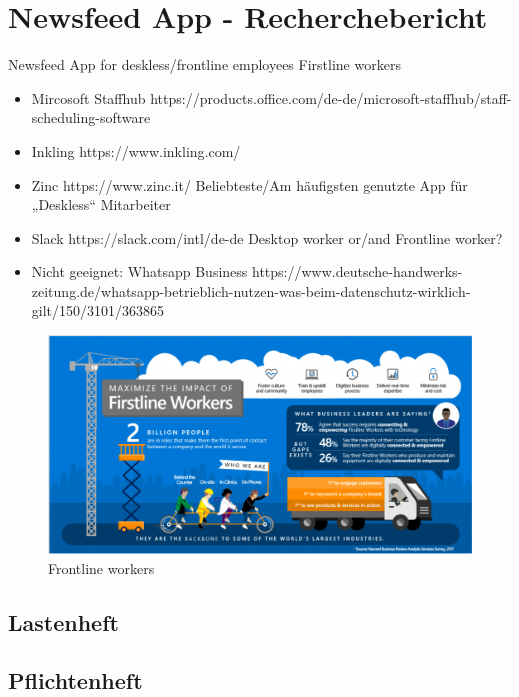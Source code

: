 \section{Newsfeed App - Recherchebericht}
\label{section:realisation:newsfeed_app}


Newsfeed App for deskless/frontline employees Firstline workers
\begin{itemize}
\item {Mircosoft Staffhub https://products.office.com/de-de/microsoft-staffhub/staff-scheduling-software}
\item {Inkling 	https://www.inkling.com/ }
\item {Zinc https://www.zinc.it/ Beliebteste/Am häufigsten genutzte App für „Deskless“ Mitarbeiter}
\item {Slack https://slack.com/intl/de-de Desktop worker or/and Frontline worker?}
\item {Nicht geeignet: Whatsapp Business https://www.deutsche-handwerks-zeitung.de/whatsapp-betrieblich-nutzen-was-beim-datenschutz-wirklich-gilt/150/3101/363865}
\end{itemize}

\begin{figure}[H] 
\centering 
\includegraphics[scale=0.48]{images/frontlineworkers} 
\caption[Frontline Workers]{Frontline workers\protect} 
\label{dem} 
\end{figure}

\subsection{Lastenheft}

\subsection{Pflichtenheft}